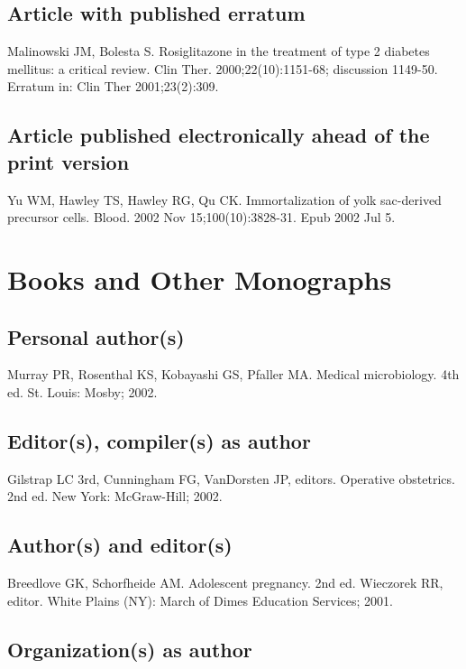 \documentclass[a4paper,10pt]{article}
\begin{document}
\subsection{Article with published erratum}

Malinowski JM, Bolesta S. Rosiglitazone in the treatment of type 2 diabetes mellitus: a critical review. Clin Ther. 2000;22(10):1151-68; discussion 1149-50. Erratum in: Clin Ther 2001;23(2):309.\cite{malinowski.bolesta:rosiglitazone}

\subsection{Article published electronically ahead of the print version}

Yu WM, Hawley TS, Hawley RG, Qu CK. Immortalization of yolk sac-derived precursor cells. Blood. 2002 Nov 15;100(10):3828-31. Epub 2002 Jul 5.\cite{yu.hawley.ea:immortalization}

\section{Books and Other Monographs}

\subsection{Personal author(s)}

Murray PR, Rosenthal KS, Kobayashi GS, Pfaller MA. Medical microbiology. 4th ed. St. Louis: Mosby; 2002.\cite{murray.rosenthal.ea:medical}

\subsection{Editor(s), compiler(s) as author}

Gilstrap LC 3rd, Cunningham FG, VanDorsten JP, editors. Operative obstetrics. 2nd ed. New York: McGraw-Hill; 2002.\cite{gilstrap.cunningham.ea:operative}

\subsection{Author(s) and editor(s)}

Breedlove GK, Schorfheide AM. Adolescent pregnancy. 2nd ed. Wieczorek RR, editor. White Plains (NY): March of Dimes Education Services; 2001.\cite{breedlove.schorfheide:adolescent}

\subsection{Organization(s) as author}
\end{document}
